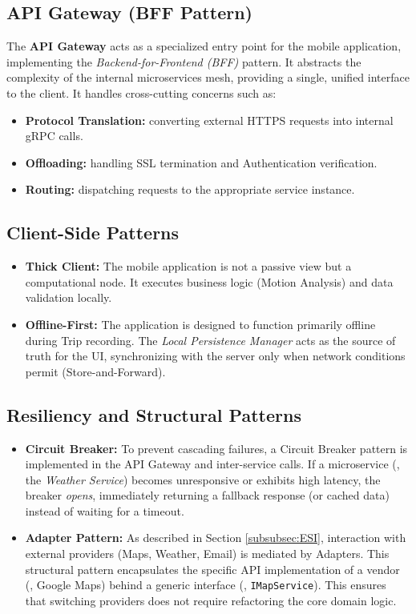 \subsection*{API Gateway (BFF Pattern)}
The \textbf{API Gateway} acts as a specialized entry point for the mobile application, implementing the \emph{Backend-for-Frontend (BFF)} pattern. It abstracts the complexity of the internal microservices mesh, providing a single, unified interface to the client. It handles cross-cutting concerns such as:
\begin{itemize}
    \item \textbf{Protocol Translation:} converting external HTTPS requests into internal gRPC calls.
    \item \textbf{Offloading:} handling SSL termination and Authentication verification.
    \item \textbf{Routing:} dispatching requests to the appropriate service instance.
\end{itemize}

\subsection*{Client-Side Patterns}
\begin{itemize}
    \item \textbf{Thick Client:} The mobile application is not a passive view but a computational node. It executes business logic (Motion Analysis) and data validation locally.
    \item \textbf{Offline-First:} The application is designed to function primarily offline during Trip recording. The \emph{Local Persistence Manager} acts as the source of truth for the UI, synchronizing with the server only when network conditions permit (Store-and-Forward).
\end{itemize}

\subsection*{Resiliency and Structural Patterns}
\begin{itemize}
    \item \textbf{Circuit Breaker:} To prevent cascading failures, a Circuit Breaker pattern is implemented in the API Gateway and inter-service calls. If a microservice (\eg, the \emph{Weather Service}) becomes unresponsive or exhibits high latency, the breaker \emph{opens}, immediately returning a fallback response (or cached data) instead of waiting for a timeout.
    \item \textbf{Adapter Pattern:} As described in Section \ref{subsubsec:ESI}, interaction with external providers (Maps, Weather, Email) is mediated by Adapters. This structural pattern encapsulates the specific API implementation of a vendor (\eg, Google Maps) behind a generic interface (\eg, \texttt{IMapService}). This ensures that switching providers does not require refactoring the core domain logic.
\end{itemize}

